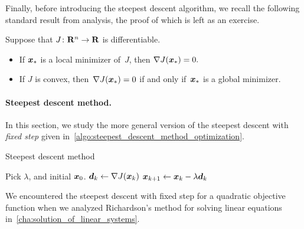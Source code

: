 Finally, before introducing the steepest descent algorithm,
we recall the following standard result from analysis,
the proof of which is left as an exercise.

\begin{theorem}
    \label{theorem:euler}
    Suppose that $J\colon \mathbf R^n \to \mathbf R$ is differentiable.
    \begin{itemize}
        \item
            If $\mathbf{\boldsymbol{x}}_*$ is a local minimizer of~$J$,
            then
            \(
                \label{eq:critical_point}
                \nabla J(\mathbf{\boldsymbol{x}}_*) = 0.
            \)

        \item
            If $J$ is convex,
            then~$\nabla J(\mathbf{\boldsymbol{x}}_*) = 0$ if and only if~$\mathbf{\boldsymbol{x}}_*$ is a global minimizer.
    \end{itemize}
\end{theorem}

\paragraph{Steepest descent method.}
In this section, we study the more general version of the steepest descent with \emph{fixed step} given in~\cref{algo:steepest_descent_method_optimization}.
\begin{algorithm}
\caption{Steepest descent method}%
\label{algo:steepest_descent_method_optimization}%
\begin{algorithmic}[1]
    \State Pick $\lambda$, and initial $\mathbf{\boldsymbol{x}}_0$.
        \State $\mathbf{\boldsymbol{d}}_k \gets \nabla J(\mathbf{\boldsymbol{x}}_k)$
        \State $\mathbf{\boldsymbol{x}}_{k+1} \gets \mathbf{\boldsymbol{x}}_{k} - \lambda \mathbf{\boldsymbol{d}}_k$
    \EndFor
\end{algorithmic}
\end{algorithm}

\begin{remark}
    We encountered the steepest descent with fixed step for a quadratic objective function when we
    analyzed Richardson's method for solving linear equations in~\cref{cha:solution_of_linear_systems}.
\end{remark}

